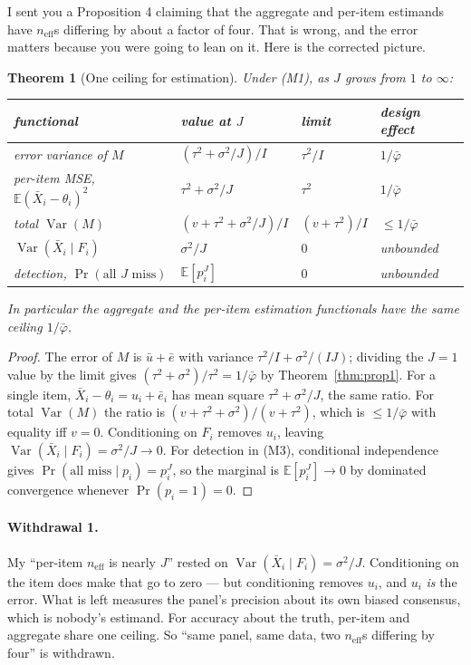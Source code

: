 \documentclass[11pt]{article}
\theoremstyle{plain}
\newtheorem{theorem}{Theorem}
\theoremstyle{definition}
\theoremstyle{remark}
\newcommand{\Var}{\operatorname{Var}}
\newcommand{\E}{\mathbb{E}}
\newcommand{\pb}{\bar{\varphi}}
\newcommand{\neff}{n_{\mathrm{eff}}}
\begin{document}
I sent you a Proposition 4 claiming that the aggregate and per-item estimands have $\neff$s
differing by about a factor of four. That is wrong, and the error matters because you were going
to lean on it. Here is the corrected picture.

\begin{theorem}[One ceiling for estimation]\label{thm:estimand}
Under \textup{(M1)}, as $J$ grows from $1$ to $\infty$:
\begin{center}
\begin{tabular}{@{}llll@{}}
\toprule
functional & value at $J$ & limit & design effect \\
\midrule
error variance of $M$             & $(\tau^2+\sigma^2/J)/I$ & $\tau^2/I$ & $1/\pb$ \\
per-item MSE, $\E(\bar X_i-\theta_i)^2$ & $\tau^2+\sigma^2/J$ & $\tau^2$ & $1/\pb$ \\
total $\Var(M)$                   & $(v+\tau^2+\sigma^2/J)/I$ & $(v+\tau^2)/I$ & $\le 1/\pb$ \\
$\Var(\bar X_i\mid F_i)$          & $\sigma^2/J$ & $0$ & unbounded \\
detection, $\Pr(\text{all }J\text{ miss})$ & $\E[p_i^J]$ & $0$ & unbounded \\
\bottomrule
\end{tabular}
\end{center}
In particular the aggregate and the per-item \emph{estimation} functionals have the
\emph{same} ceiling $1/\pb$.
\end{theorem}

\begin{proof}
The error of $M$ is $\bar u+\bar e$ with variance $\tau^2/I+\sigma^2/(IJ)$; dividing the $J=1$
value by the limit gives $(\tau^2+\sigma^2)/\tau^2=1/\pb$ by Theorem~\ref{thm:prop1}. For a
single item, $\bar X_i-\theta_i=u_i+\bar e_i$ has mean square $\tau^2+\sigma^2/J$, the same ratio.
For total $\Var(M)$ the ratio is $(v+\tau^2+\sigma^2)/(v+\tau^2)$, which is $\le 1/\pb$ with
equality iff $v=0$. Conditioning on $F_i$ removes $u_i$, leaving $\Var(\bar X_i\mid
F_i)=\sigma^2/J\to0$. For detection in \textup{(M3)}, conditional independence gives
$\Pr(\text{all miss}\mid p_i)=p_i^J$, so the marginal is $\E[p_i^J]\to 0$ by dominated
convergence whenever $\Pr(p_i=1)=0$.
\end{proof}

\paragraph{Withdrawal 1.} My ``per-item $\neff$ is nearly $J$'' rested on
$\Var(\bar X_i\mid F_i)=\sigma^2/J$. Conditioning on the item does make that go to zero --- but
conditioning removes $u_i$, and $u_i$ \emph{is} the error. What is left measures the panel's
precision about its own biased consensus, which is nobody's estimand. For accuracy about the
truth, per-item and aggregate share one ceiling. So ``same panel, same data, two $\neff$s
differing by four'' is withdrawn.
\end{document}
